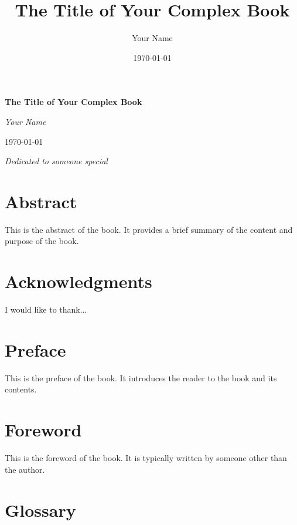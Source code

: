 \documentclass[12pt, oneside]{book}
\title{The Title of Your Complex Book}
\author{Your Name}
\date{\today}
\begin{document}
\begin{titlepage}
    \centering
    \vspace*{1in}
    {\Huge\bfseries The Title of Your Complex Book\par}
    \vspace{1.5in}
    {\Large\itshape Your Name\par}
    \vfill
    {\Large \today\par}
\end{titlepage}

\clearpage
\thispagestyle{empty}
\vspace*{3in}
\begin{center}
    \textit{Dedicated to someone special}
\end{center}

\clearpage
\chapter*{Abstract}
This is the abstract of the book. It provides a brief summary of the content and purpose of the book.

\clearpage
\chapter*{Acknowledgments}
I would like to thank...

\clearpage
\chapter*{Preface}
This is the preface of the book. It introduces the reader to the book and its contents.

\clearpage
\chapter*{Foreword}
This is the foreword of the book. It is typically written by someone other than the author.

\clearpage
\tableofcontents

\clearpage
\listoffigures

\clearpage
\listoftables

\clearpage
\chapter*{Glossary}
\printglossary
\end{document}
